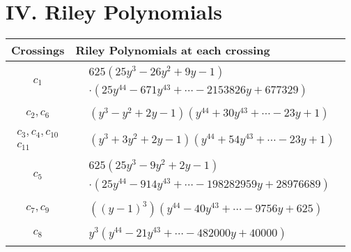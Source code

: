 \documentclass[1p]{elsarticle_modified}
\theoremstyle{definition}
\begin{document}
\centering \section*{ IV. Riley Polynomials}
\begin{tabular}{m{50pt}|m{274pt}}
Crossings & \hspace{64pt}Riley Polynomials at each crossing \\
\hline $$\begin{aligned}c_{1}\end{aligned}$$&$\begin{aligned}
&625(25 y^3-26 y^2+9 y-1)\\
&\cdot(25 y^{44}-671 y^{43}+\cdots-2153826 y+677329)
\end{aligned}$\\
\hline $$\begin{aligned}c_{2},c_{6}\end{aligned}$$&$\begin{aligned}
&(y^3- y^2+2 y-1)(y^{44}+30 y^{43}+\cdots-23 y+1)
\end{aligned}$\\
\hline $$\begin{aligned}c_{3},c_{4},c_{10}\\c_{11}\end{aligned}$$&$\begin{aligned}
&(y^3+3 y^2+2 y-1)(y^{44}+54 y^{43}+\cdots-23 y+1)
\end{aligned}$\\
\hline $$\begin{aligned}c_{5}\end{aligned}$$&$\begin{aligned}
&625(25 y^3-9 y^2+2 y-1)\\
&\cdot(25 y^{44}-914 y^{43}+\cdots-198282959 y+28976689)
\end{aligned}$\\
\hline $$\begin{aligned}c_{7},c_{9}\end{aligned}$$&$\begin{aligned}
&((y-1)^3)(y^{44}-40 y^{43}+\cdots-9756 y+625)
\end{aligned}$\\
\hline $$\begin{aligned}c_{8}\end{aligned}$$&$\begin{aligned}
&y^3(y^{44}-21 y^{43}+\cdots-482000 y+40000)
\end{aligned}$\\
\hline
\end{tabular}
\vskip 2pc
\end{document}
